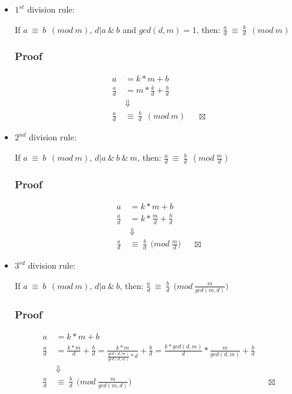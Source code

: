 \documentclass[11pt,twoside]{article}
\theoremstyle{defi}
\begin{document}
\begin{itemize}
\item $1^{st}$ division rule:

If $a\ \equiv\ b\ \ (mod\ m)$, $d|a\ \&\ b$ and $gcd(d,m)=1$, then: $\frac{a}{d}\ \equiv\ \frac{b}{d}\ \ (mod\ m)$
\subsubsection{Proof}
\begin{align*}
a &= k*m + b\\
\frac{a}{d} &= m*\frac{k}{d} + \frac{b}{d} \\
& \Downarrow \\
\frac{a}{d}\ &\equiv\ \frac{b}{d}\ \ (mod\ m)
&&\boxtimes
\end{align*}

\item $2^{nd}$ division rule:

If $a\ \equiv\ b\ \ (mod\ m)$, $d|a\ \&\ b\ \& \ m$, then: $\frac{a}{d}\ \equiv \ \frac{b}{d}\ \ (mod\ \frac{m}{d})$
\subsubsection{Proof}
\begin{align*}
a &= k*m + b\\
\frac{a}{d} &= k*\frac{m}{d} + \frac{b}{d} \\
& \Downarrow \\
\frac{a}{d}\ &\equiv\ \frac{b}{d}\ \ \bigg( mod\ \frac{m}{d} \bigg)
&&\boxtimes
\end{align*}

\item $3^{rd}$ division rule:

If $a\ \equiv\ b\ \ (mod\ m)$, $d|a\ \&\ b$, then: $\frac{a}{d}\ \equiv \ \frac{b}{d}\ \ \big( mod\ \frac{m}{gcd(m,d)}\big)$
\subsubsection{Proof}
\begin{align*}
a &= k*m + b\\
\frac{a}{d} &= \frac{k*m}{d} + \frac{b}{d} = \frac{k*m}{\frac{gcd(d,m)}{gcd(d,m)}*d} + \frac{b}{d} = \frac{k*gcd(d,m)}{d}*\frac{m}{gcd(d,m)} + \frac{b}{d}\\
& \Downarrow \\
\frac{a}{d}\ &\equiv \ \frac{b}{d}\ \ \Bigg( mod\ \frac{m}{gcd(m,d)}\Bigg)
&&\boxtimes
\end{align*}

\end{itemize}
\end{document}
